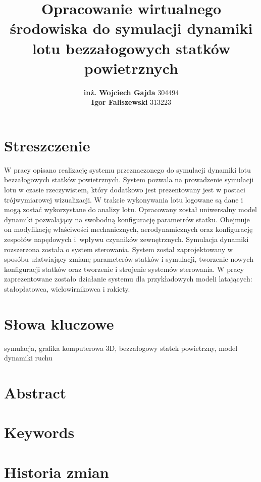 \documentclass[15pt]{sprawozdanie}
\title{Opracowanie wirtualnego środowiska do symulacji dynamiki lotu bezzałogowych statków powietrznych}
\author{\textbf{inż. Wojciech Gajda} 304494\\\vspace{20pt}\textbf{Igor Faliszewski} 313223}
\begin{document}



\section*{Streszczenie}
W pracy opisano realizację systemu przeznaczonego do symulacji dynamiki lotu bezzałogowych statków powietrznych. System pozwala na prowadzenie symulacji lotu w czasie rzeczywistem, który dodatkowo jest prezentowany jest w postaci trójwymiarowej wizualizacji. W trakcie wykonywania lotu logowane są dane i mogą zostać wykorzystane do analizy lotu. Opracowany został uniwersalny model dynamiki pozwalający na swobodną konfigurację parametrów statku. Obejmuje on modyfikację właściwości mechanicznych, aerodynamicznych oraz konfigurację zespołów napędowych i~wpływu czynników zewnętrznych. Symulacja dynamiki rozszerzona została o system sterowania. System został zaprojektowany w sposóbu ułatwiający zmianę parameterów statków i symulacji, tworzenie nowych konfiguracji statków oraz tworzenie i strojenie systemów sterowania. W pracy zaprezentowane zostało działanie systemu dla przykładowych modeli latających: stałopłatowca, wielowirnikowca i rakiety.

\section*{Słowa kluczowe}

symulacja, grafika komputerowa 3D, bezzałogowy statek powietrzny, model dynamiki ruchu

\newpage

\section*{Abstract}

\section*{Keywords}

\newpage
\tableofcontents

\newpage

\section{Historia zmian}
\begin{versionhistory}
\end{versionhistory}
\end{document}
